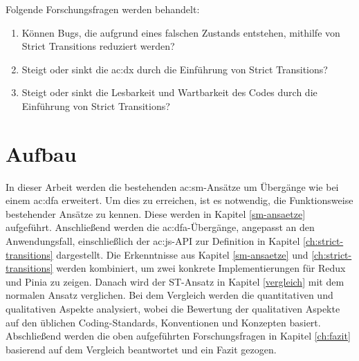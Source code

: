 Folgende Forschungsfragen werden behandelt:

\begin{enumerate}
  \item Können Bugs, die aufgrund eines falschen Zustands entstehen, mithilfe von Strict Transitions reduziert werden?
  \item Steigt oder sinkt die \acrshort{ac:dx} durch die Einführung von Strict Transitions?
  \item Steigt oder sinkt die Lesbarkeit und Wartbarkeit des Codes durch die Einführung von Strict Transitions?
\end{enumerate}

\section{Aufbau}

In dieser Arbeit werden die bestehenden \acrshort{ac:sm}-Ansätze um Übergänge wie bei einem \acrshort{ac:dfa} erweitert. Um dies zu erreichen, ist es notwendig, die Funktionsweise bestehender Ansätze zu kennen. Diese werden in Kapitel \ref{sm-ansaetze} aufgeführt. Anschließend werden die \acrlong{ac:dfa}-Übergänge, angepasst an den Anwendungsfall, einschließlich der \acrlong{ac:js}-API zur Definition in Kapitel \ref{ch:strict-transitions} dargestellt. Die Erkenntnisse aus Kapitel \ref{sm-ansaetze} und \ref{ch:strict-transitions} werden kombiniert, um zwei konkrete Implementierungen für Redux und Pinia zu zeigen. Danach wird der ST-Ansatz in Kapitel \ref{vergleich} mit dem normalen Ansatz verglichen. Bei dem Vergleich werden die quantitativen und qualitativen Aspekte analysiert, wobei die Bewertung der qualitativen Aspekte auf den üblichen Coding-Standards, Konventionen und Konzepten basiert. Abschließend werden die oben aufgeführten Forschungsfragen in Kapitel \ref{ch:fazit} basierend auf dem Vergleich beantwortet und ein Fazit gezogen.
